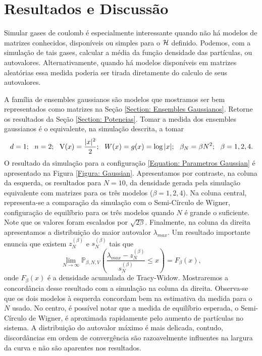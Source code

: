 \section{Resultados e Discussão}

Simular gases de coulomb é especialmente interessante quando não há modelos de matrizes conhecidos, disponíveis ou simples para o $\operatorname{\mathcal{H}}$ definido. Podemos, com a simulação de tais gases, calcular a média da função densidade das partículas, ou autovalores. Alternativamente, quando há modelos disponíveis em matrizes aleatórias essa medida poderia ser tirada diretamente do calculo de seus autovalores.

A família de ensembles gaussianos são modelos que mostramos ser bem representados como matrizes na Seção \ref{Section: Ensembles Gaussianos}. Retorne os resultados da Seção \ref{Section: Potencias}. Tomar a medida dos ensembles gaussianos é o equivalente, na simulação descrita, a tomar 
\begin{equation}
d = 1; \ \  n = 2; \ \ \V(x)=\frac{|x|^2}{2}; \ \ W(x) = g(x) = \log{|x|}; \ \ \beta_N = \beta N^2; \ \ \beta = 1,2,4.
\label{Equation: Parametros Gaussian}
\end{equation}
O resultado da simulação para a configuração \ref{Equation: Parametros Gaussian} é apresentado na Figura \ref{Figura: Gaussian}. Apresentamos por contraste, na coluna da esquerda, os resultados para $N=10$, da densidade gerada pela simulação equivalente com matrizes para os três modelos ($\beta = 1,2,4$). Na coluna central, representa-se a comparação da simulação com o Semi-Círculo de Wigner, configuração de equilíbrio para os três modelos quando $N$ é grande o suficiente. Note que os valores foram escalados por $\sqrt{2 \beta}$. Finalmente, na coluna da direita apresentamos a distribuição do maior autovalor $\lambda_{max}$. Um resultado importante  \cite{Tracy} enuncia que existem $z_{N}^{(\beta)}$ e $s_N^{(\beta)}$ tais que $$\lim_{N \to \infty} \mathbb{P}_{\beta,N,V} \left( \frac{\lambda_{max} - z_{N}^{(\beta)}}{s_N^{(\beta)}} \leq x \right) = F_{\beta}(x),$$ onde $F_{\beta}(x)$ é a densidade acumulada de Tracy-Widow. Mostraremos a concordância desse resultado com a simulação na coluna da direita. Observa-se que os dois modelos à esquerda concordam bem na estimativa da medida para o $N$ usado. No centro, é possível notar que a medida de equilíbrio esperada, o Semi-Círculo de Wigner, é aproximada rapidamente pelo aumento de partículas no sistema. A distribuição do autovalor máximo é mais delicada, contudo, discordâncias em ordem de convergência são razoavelmente influentes na largura da curva e não são aparentes nos resultados.
